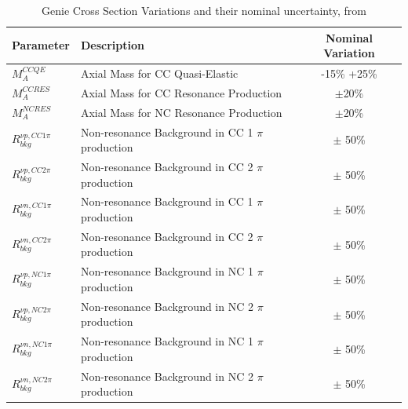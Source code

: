 {
\renewcommand{\arraystretch}{1.5}
\begin{table}[tb]
  \caption[Genie Cross Section Variations]{Genie Cross Section Variations and their nominal uncertainty, from \cite{Andreopoulos:2015wxa}}
  \label{tab:genie_xsec_params}
  \centering

  \begin{tabular}{l|lc}
  \hline

  \hline
  \textbf{Parameter} & \textbf{Description} & \textbf{Nominal Variation} \\
  \hline
     $M_A^{CCQE}$ & Axial Mass for CC Quasi-Elastic & -15\% +25\%  \\
     $M_A^{CCRES}$ & Axial Mass for CC Resonance Production & $\pm$20\%  \\
     $M_A^{NCRES}$ & Axial Mass for NC Resonance Production & $\pm$20\%  \\
     $R_{bkg}^{\nu p, CC 1 \pi}$& Non-resonance Background in CC 1 $\pi$ production & $\pm$ 50\% \\
     $R_{bkg}^{\nu p, CC 2 \pi}$& Non-resonance Background in CC 2 $\pi$ production & $\pm$ 50\% \\
     $R_{bkg}^{\nu n, CC 1 \pi}$& Non-resonance Background in CC 1 $\pi$ production & $\pm$ 50\% \\
     $R_{bkg}^{\nu n, CC 2 \pi}$& Non-resonance Background in CC 2 $\pi$ production & $\pm$ 50\% \\
     $R_{bkg}^{\nu p, NC 1 \pi}$& Non-resonance Background in NC 1 $\pi$ production & $\pm$ 50\% \\
     $R_{bkg}^{\nu p, NC 2 \pi}$& Non-resonance Background in NC 2 $\pi$ production & $\pm$ 50\% \\
     $R_{bkg}^{\nu n, NC 1 \pi}$& Non-resonance Background in NC 1 $\pi$ production & $\pm$ 50\% \\
     $R_{bkg}^{\nu n, NC 2 \pi}$& Non-resonance Background in NC 2 $\pi$ production & $\pm$ 50\% \\
  \hline

  \hline
  \end{tabular}
\end{table}
}


